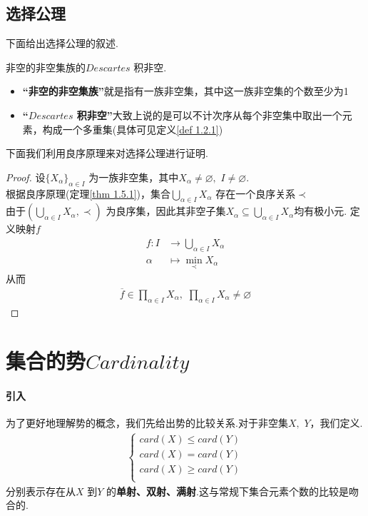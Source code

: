 \newpage
\subsection{选择公理}
	下面给出选择公理的叙述.
	\begin{thm}\label{thm 1.5.2}
		非空的非空集族的$Descartes$ 积非空.
		\begin{rmk}
			\begin{itemize}
				\item \textbf{“非空的非空集族”}就是指有一族非空集，其中这一族非空集的个数至少为1
				
				\item \textbf{“$Descartes$ 积非空”}大致上说的是可以不计次序从每个非空集中取出一个元素，构成一个多重集(具体可见定义\ref{def 1.2.1})
			\end{itemize}
		\end{rmk}
	\end{thm}

\vspace*{1em}
	下面我们利用良序原理来对选择公理进行证明.
	\begin{proof}
		设$\{ X_\alpha \}_{\alpha \in I}$ 为一族非空集，其中$X_\alpha \neq \varnothing , \,\, I \neq \varnothing$.\\
		根据良序原理(定理\ref{thm 1.5.1})，集合$\underset{\alpha \in I}{\bigcup}{X_\alpha}$ 存在一个良序关系$\prec$\\
		由于$(\underset{\alpha \in I}{\bigcup}{X_\alpha} , \prec)$ 为良序集，因此其非空子集$X_\alpha \subseteq \underset{\alpha \in I}{\bigcup}{X_\alpha}$均有极小元.
		定义映射$f$
		\begin{align}
			f : I &\longrightarrow \bigcup_{\alpha \in I}{X_\alpha}\\
			\alpha &\longmapsto \min_{\prec}{X_\alpha}
		\end{align}
		从而
		\begin{align}
			\overline{f} \in \prod_{\alpha \in I}{X_\alpha} , \,\, \prod_{\alpha \in I}{X_\alpha} \neq \varnothing
		\end{align}
	\end{proof}

\newpage
\section{集合的势$Cardinality$}
\paragraph{引入}
	为了更好地理解势的概念，我们先给出势的比较关系.对于非空集$X , \,\, Y$，我们定义.
	\begin{align}
		\begin{cases}
			card\left( X \right) \leqslant card\left( Y \right)\\
			card\left( X \right) =card\left( Y \right)\\
			card\left( X \right) \geqslant card\left( Y \right)\\
		\end{cases}
	\end{align}
	分别表示存在从$X$ 到$Y$ 的\textbf{单射、双射、满射}.这与常规下集合元素个数的比较是吻合的.
	
